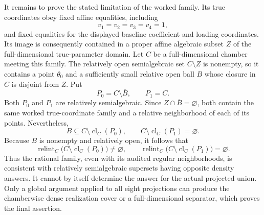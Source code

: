 It remains to prove the stated limitation of the worked family.  Its true
coordinates obey fixed affine equalities, including
\[
 v_1=v_2=v_3=v_4=1,
\]
and fixed equalities for the displayed baseline coefficient and loading
coordinates.  Its image is consequently contained in a proper affine
algebraic subset \(Z\) of the full-dimensional true-parameter domain.  Let
\(C\) be a full-dimensional chamber meeting this family.  The relatively
open semialgebraic set \(C\setminus Z\) is nonempty, so it contains a point
\(\theta_0\) and a sufficiently small relative open ball \(B\) whose closure
in \(C\) is disjoint from \(Z\).  Put
\[
 P_0=C\setminus\overline B,
 \qquad
 P_1=C.
\]
Both \(P_0\) and \(P_1\) are relatively semialgebraic.  Since
\(Z\cap\overline B=\varnothing\), both contain the same worked true-coordinate
family and a relative neighborhood of each of its points.  Nevertheless,
\[
 B\subseteq C\setminus\operatorname{cl}_C(P_0),
 \qquad
 C\setminus\operatorname{cl}_C(P_1)=\varnothing.
\]
Because \(B\) is nonempty and relatively open, it follows that
\[
 \operatorname{relint}_C
 \bigl(C\setminus\operatorname{cl}_C(P_0)\bigr)\ne\varnothing,
 \qquad
 \operatorname{relint}_C
 \bigl(C\setminus\operatorname{cl}_C(P_1)\bigr)=\varnothing.
\]
Thus the rational family, even with its audited regular neighborhoods, is
consistent with relatively semialgebraic supersets having opposite density
answers.  It cannot by itself determine the answer for the actual projected
union.  Only a global argument applied to all eight projections can produce
the chamberwise dense realization cover or a full-dimensional separator,
which proves the final assertion.
